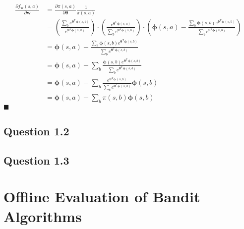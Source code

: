 \documentclass[a4paper]{article}
\newcommand*{\QEDA}{\hfill\ensuremath{\blacksquare}}%
\begin{document}
\begin{align*}
  \frac{\partial f_{\boldsymbol{w}}(s, a)}{\partial \boldsymbol{w}}
  &=\frac{\partial \pi(s, a)}{\partial \boldsymbol{\theta}} \frac{1}{\pi(s, a)}\\
  &=\left(\frac{\sum_{b} e^{\boldsymbol{\theta}^{\mathrm{T}} \boldsymbol{\phi}(s, b)}}
               {e^{\boldsymbol{\theta}^{\mathrm{T}} \boldsymbol{\phi}(s, a)}}\right)
    \cdot
    \left(\frac{e^{\boldsymbol{\theta}^{\mathrm{T}} \boldsymbol{\phi}(s, a)}}
         {\sum_{b} e^{\boldsymbol{\theta}^{\mathrm{T}} \boldsymbol{\phi}(s, b)}}\right)
    \cdot
    \left(
    \boldsymbol{\phi}(s, a)-
    \frac{\sum_{b} \boldsymbol{\phi}(s, b)e^{\boldsymbol{\theta}^{\mathrm{T}} \boldsymbol{\phi}(s, b)}}
         {\sum_{b} e^{\boldsymbol{\theta}^{\mathrm{T}} \boldsymbol{\phi}(s, b)}}
    \right)\\
    &=
    \boldsymbol{\phi}(s, a)-
    \frac{\sum_{b} \boldsymbol{\phi}(s, b)e^{\boldsymbol{\theta}^{\mathrm{T}} \boldsymbol{\phi}(s, b)}}
         {\sum_{b} e^{\boldsymbol{\theta}^{\mathrm{T}} \boldsymbol{\phi}(s, b)}}\\
    &=
    \boldsymbol{\phi}(s, a)-
    \sum_{b} \frac{\boldsymbol{\phi}(s, b)e^{\boldsymbol{\theta}^{\mathrm{T}} \boldsymbol{\phi}(s, b)}}
         {\sum_{b} e^{\boldsymbol{\theta}^{\mathrm{T}} \boldsymbol{\phi}(s, b)}}\\
    &=
    \boldsymbol{\phi}(s, a)-
    \sum_{b} \frac{e^{\boldsymbol{\theta}^{\mathrm{T}} \boldsymbol{\phi}(s, b)}}
        {\sum_{b} e^{\boldsymbol{\theta}^{\mathrm{T}} \boldsymbol{\phi}(s, b)}
        }\boldsymbol{\phi}(s, b)\\
    &=
    \boldsymbol{\phi}(s, a)-
    \sum_{b}
    \pi(s, b)
    \boldsymbol{\phi}(s, b)
\end{align*}
\QEDA

\subsection*{Question 1.2}
\label{subsec:11}

\subsection*{Question 1.3}
\label{subsec:11}

\section{Offline Evaluation of Bandit Algorithms}
\label{sec:2}
\end{document}
